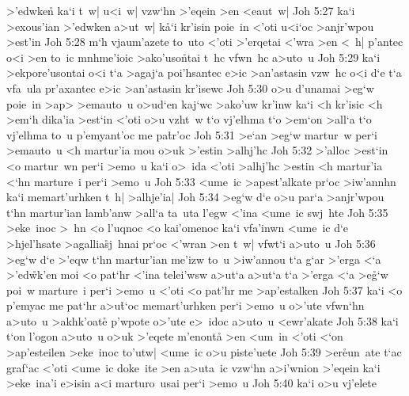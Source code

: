 >'edwken\r{}
ka`i
t~w|
u<i~w|
vzw`hn
>'eqein
>en
<eaut~w|\bibvsend
\vs Joh 5:27
ka`i
>exous'ian
>'edwken
a>ut~w|
k\r{a}`i
kr'isin
poie~in
<'oti
u<i`oc
>anjr'wpou
>est'in\bibvsend
\vs Joh 5:28
m`h
vjaum'azete
to~uto
<'oti
>'erqetai
<'wra
>en
<~h|
p'antec
o<i
>en
to~ic
mnhme'ioic
>ako'uso\r{n}tai
t~hc
vfwn~hc
a>uto~u\bibvsend
\vs Joh 5:29
ka`i
>ekpore'usontai
o<i
t`a
>agaj`a
poi'hsantec
e>ic
>an'astasin
vzw~hc
o<i
d`e
t`a
vfa~ula
pr'axantec
e>ic
>an'astasin
kr'isewc\bibvsend
\vs Joh 5:30
o>u
d'unamai
>eg`w
poie~in
>ap>
>emauto~u
o>ud`en
kaj`wc
>ako'uw
kr'inw
ka`i
<h
kr'isic
<h
>em`h
dika'ia
>est`in
<'oti
o>u
vzht~w
t`o
vj'elhma
t`o
>em`on
>all`a
t`o
vj'elhma
to~u
p'emyant'oc
me
pa\r{t}r'oc\bibvsend
{}
\vs Joh 5:31
>e`an
>eg`w
martur~w
per`i
>emauto~u
<h
martur'ia
mou
o>uk
>'estin
>alhj'hc\bibvsend
\vs Joh 5:32
>'alloc
>est`in
<o
martur~wn
per`i
>emo~u
ka`i
o>~ida
<'oti
>alhj'hc
>estin
<h
martur'ia
<`hn
marture~i
per`i
>emo~u\bibvsend
\vs Joh 5:33
<ume~ic
>apest'alkate
pr`oc
>iw'annhn
ka`i
memart'urhken
t~h|
>alhje'ia|\bibvsend
\vs Joh 5:34
>eg`w
d`e
o>u
par`a
>anjr'wpou
t`hn
martur'ian
lamb'anw
>all`a
ta~uta
l'egw
<'ina
<ume~ic
swj~hte\bibvsend
\vs Joh 5:35
>eke~inoc
>~hn
<o
l'uqnoc
<o
kai'omenoc
ka`i
vfa'inwn
<ume~ic
d`e
>hjel'hsate
>agallia\r{s}j~hnai
pr`oc
<'wran
>en
t~w|
vfwt`i
a>uto~u\bibvsend
\vs Joh 5:36
>eg`w
d`e
>'eqw
t`hn
martur'ian
me'izw
to~u
>iw'annou
t`a
g`ar
>'erga
<`a
>'ed\r{w}k'en
moi
<o
pat`hr
<'ina
telei'wsw
a>ut`a
a>ut`a
t`a
>'erga
<`a
>e\r{g}`w
poi~w
marture~i
per`i
>emo~u
<'oti
<o
pat'hr
me
>ap'estalken\bibvsend
\vs Joh 5:37
ka`i
<o
p'emyac
me
pat`hr
a>u\r{t}`oc
memart'urhken
per`i
>emo~u
o>'ute
vfwn`hn
a>uto~u
>akhk'oate\r{}
p'wpote
o>'ute
e>~idoc
a>uto~u
<ewr'akate\bibvsend
\vs Joh 5:38
ka`i
t`on
l'ogon
a>uto~u
o>uk
>'eqete
m'enonta\r{}
>en
<um~in
<'oti
<`on
>ap'esteilen
>eke~inoc
to'utw|
<ume~ic
o>u
piste'uete\bibvsend
\vs Joh 5:39
>er\r{e}un~ate
t`ac
graf`ac
<'oti
<ume~ic
doke~ite
>en
a>uta~ic
vzw`hn
a>i'wnion
>'eqein
ka`i
>eke~ina'i
e>isin
a<i
marturo~usai
per`i
>emo~u\bibvsend
\vs Joh 5:40
ka`i
o>u
vj'elete

